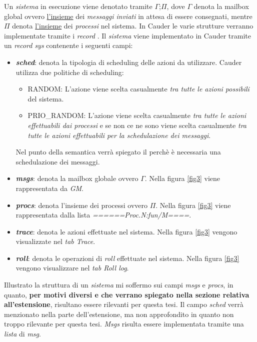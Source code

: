 \documentclass[background.tex]{subfiles}
\begin{document}
Un \textit{sistema} in esecuzione viene denotato tramite $\Gamma$;$\Pi$, dove $\Gamma$ denota la mailbox global ovvero \underline{l'insieme} dei \textit{messaggi inviati} in attesa di essere consegnati, mentre $\Pi$ denota \underline{l'insieme} dei \textit{processi} nel sistema.
In Cauder le varie strutture verranno implementate tramite i \textit{record} \cite{erlangRecord}.
Il \textit{sistema} viene implementato in Cauder tramite un \textit{record sys} contenente i seguenti campi:
	\begin{itemize}
		\item \textit{\textbf{sched}}: denota la tipologia di scheduling delle azioni da utilizzare. Cauder utilizza due politiche di scheduling:
			\begin{itemize}
				\item RANDOM: L'azione viene scelta casualmente \textit{tra tutte le azioni possibili} del sistema.
				\item PRIO\_RANDOM: L'azione viene scelta casualmente \textit{tra tutte le azioni effettuabili dai processi} e se non ce ne sono viene scelta casualmente \textit{tra tutte le azioni effettuabili per la schedulazione dei messaggi}.
			\end{itemize}
			Nel punto della semantica verrà spiegato il perchè è necessaria una schedulazione dei messaggi.
		\item \textit{\textbf{msgs}}: denota la mailbox globale ovvero $\Gamma$. Nella figura \ref{fig3} viene rappresentata da \textit{GM}.
		\item \textit{\textbf{procs}}: denota l'insieme dei processi ovvero $\Pi$. Nella figura \ref{fig3} viene rappresentata dalla lista \textit{======Proc.N:fun/M====}.
		\item \textit{\textbf{trace}}: denota le azioni effettuate nel sistema. Nella figura \ref{fig3} vengono visualizzate nel \textit{tab Trace}.
		\item \textit{\textbf{roll}}: denota le operazioni di \textit{roll} effettuate nel sistema. Nella figura \ref{fig3} vengono visualizzare nel \textit{tab Roll log}.
	\end{itemize}
Illustrato la struttura di un \textit{sistema} mi soffermo sui campi \textit{msgs} e \textit{procs}, in quanto, \textbf{per motivi diversi e che verrano spiegato nella sezione relativa all'estensione}, risultano essere rilevanti per questa tesi.
Il campo \textit{sched} verrà menzionato nella parte dell'estensione, ma non approfondito in quanto non troppo rilevante per questa tesi.
\textit{Msgs} risulta essere implementata tramite una \textit{lista} di \textit{msg}.\\
\end{document}
